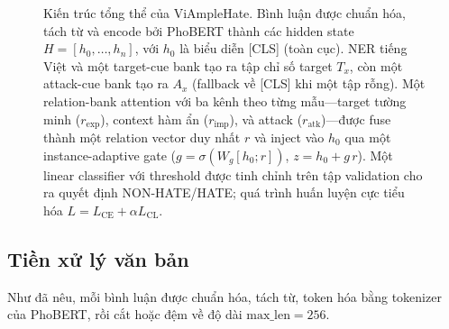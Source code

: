 \documentclass[11pt]{article}
\begin{document}
\begin{figure}[tp]
{%
  }
  \caption{Kiến trúc tổng thể của ViAmpleHate. Bình luận được chuẩn hóa, tách từ và encode bởi PhoBERT thành các hidden state $H=[h_0,\dots,h_n]$, với $h_0$ là biểu diễn [CLS] (toàn cục). NER tiếng Việt và một target-cue bank tạo ra tập chỉ số target $T_x$, còn một attack-cue bank tạo ra $A_x$ (fallback về [CLS] khi một tập rỗng). Một relation-bank attention với ba kênh theo từng mẫu---target tường minh ($r_{\mathrm{exp}}$), context hàm ẩn ($r_{\mathrm{imp}}$), và attack ($r_{\mathrm{atk}}$)---được fuse thành một relation vector duy nhất $r$ và inject vào $h_0$ qua một instance-adaptive gate ($g=\sigma(W_g[h_0;r])$, $z=h_0+g\,r$). Một linear classifier với threshold được tinh chỉnh trên tập validation cho ra quyết định NON-HATE/HATE; quá trình huấn luyện cực tiểu hóa $L=L_{\mathrm{CE}}+\alpha L_{\mathrm{CL}}$.}
  \label{fig:arch}
\end{figure}

\subsection{Tiền xử lý văn bản}
Như đã nêu, mỗi bình luận được chuẩn hóa, tách từ, token hóa bằng tokenizer của PhoBERT, rồi cắt hoặc đệm về độ dài $\mathrm{max\_len}=256$.
\end{document}
